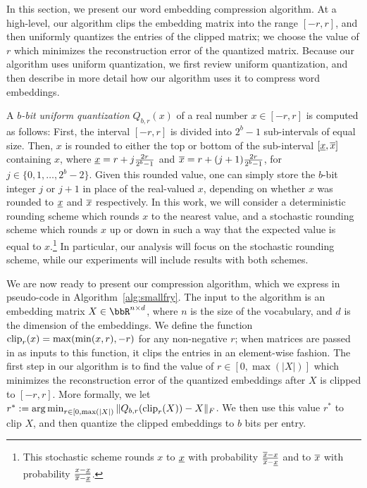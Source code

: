 In this section, we present our word embedding compression algorithm.
At a high-level, our algorithm clips the embedding matrix into the range $[-r,r]$, and then uniformly quantizes the entries of the clipped matrix;
we choose the value of $r$ which minimizes the reconstruction error of the quantized matrix.
Because our algorithm uses uniform quantization, we first review uniform quantization, and then describe in more detail how our algorithm uses it to compress word embeddings.

A \textit{$b$-bit uniform quantization} $Q_{b,r}(x)$ of a real number $x \in [-r,r]$ is computed as follows:
First, the interval $[-r,r]$ is divided into $2^b - 1$ sub-intervals of equal size.
Then, $x$ is rounded to either the top or bottom of the sub-interval $[\ulx,\olx]$ containing $x$, where $\ulx = r + j\frac{2r}{2^b-1}$ and $\olx = r + (j+1)\frac{2r}{2^b-1}$, for $j\in\{0,1,\ldots,2^b-2\}$.
Given this rounded value, one can simply store the $b$-bit integer $j$ or $j+1$ in place of the real-valued $x$, depending on whether $x$ was rounded to $\ulx$ and $\olx$ respectively.
In this work, we will consider a deterministic rounding scheme which rounds $x$ to the nearest value, and a stochastic rounding scheme which rounds $x$ up or down in such a way that the expected value is equal to $x$.\footnote{
	This stochastic scheme rounds $x$ to $\ulx$ with probability $\frac{\olx-x}{\olx-\ulx}$ and to $\olx$ with probability $\frac{x-\ulx}{\olx-\ulx}$.
}
In particular, our analysis will focus on the stochastic rounding scheme, while our experiments will include results with both schemes.


We are now ready to present our compression algorithm, which we express in pseudo-code in Algorithm~\ref{alg:smallfry}.
The input to the algorithm is an embedding matrix $X \in \RR^{n\times d}$, where $n$ is the size of the vocabulary, and $d$ is the dimension of the embeddings.
We define the function $\clip_r(x) = \max(\min(x,r),-r)$ for any non-negative $r$; when matrices are passed in as inputs to this function, it clips the entries in an element-wise fashion.
The first step in our algorithm is to find the value of $r \in [0,\max(|X|)]$ which minimizes the reconstruction error of the quantized embeddings after $X$ is clipped to $[-r,r]$.
More formally, we let $r^* \defeq \argmin_{r \in [0,\max(|X|)} \|Q_{b,r}(\clip_r(X))-X\|_F$.
We then use this value $r^*$ to clip $X$, and then quantize the clipped embeddings to $b$ bits per entry.

